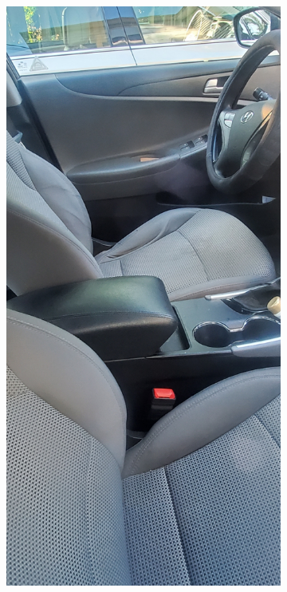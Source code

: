 \documentclass[12pt]{article}
\begin{document}
\begin{figure}[!ht]
\begin{subfigure}[b]{0.3\textwidth}
        \caption{}
    \end{subfigure}
    \hspace{2 pt}
    \begin{subfigure}[b]{0.3\textwidth}
        \centering
        \includegraphics[width=\textwidth]{images/car2.png}

\end{subfigure}
\end{figure}
\end{document}
